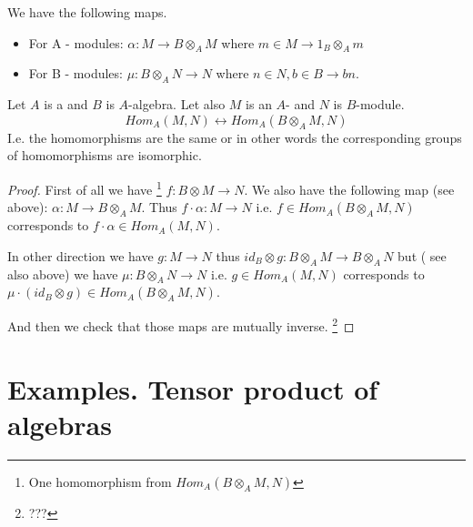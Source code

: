 We have the
following maps.
\begin{itemize}
  \label{item:lec4_maps}
\item For A - modules: $\alpha: M \to B \otimes_A M$ where
  $m \in M \to 1_B \otimes_A m$
\item For B - modules:  $\mu: B \otimes_A N \to N$ where
  $n \in N, b \in B \to b n$.
\end{itemize}

\begin{theorem}
  Let $A$ is a  and $B$ is $A$-algebra. Let also $M$
  is an $A$- and $N$ is $B$-module.
  \[
  Hom_A\left(M, N\right)
  \leftrightarrow
  Hom_A\left(B \otimes_A M, N\right)
  \]
  I.e. the homomorphisms are the same or in other words the
  corresponding groups of homomorphisms are isomorphic. 
  \begin{proof}
    First of all we have
    \footnote{
      One homomorphism from  $Hom_A\left(B \otimes_A M, N\right)$
    }
     $f: B \otimes M \to N$. We also have
    the following map (see above): $\alpha: M \to B \otimes_A M$.
    Thus $f \cdot \alpha: M \to N$ i.e.
    $f \in Hom_A\left(B \otimes_A M, N\right)$ corresponds to
    $f\cdot \alpha \in Hom_A\left(M, N\right)$.

    In other direction we have $g: M \to N$ thus
    $id_B \otimes g: B \otimes_A M \to B \otimes_A N$ but ( see also
    above) we have $\mu: B \otimes_A N \to N$ i.e.
    $g \in Hom_A\left(M, N\right)$ corresponds to
    $\mu \cdot (id_B \otimes g) \in Hom_A\left(B \otimes_A M, N\right)$.
    
    And then we check that those maps are mutually inverse.
    \footnote{
      ???
    }
  \end{proof}
  \label{thm:basechange}
\end{theorem}

\section{Examples. Tensor product of algebras}

